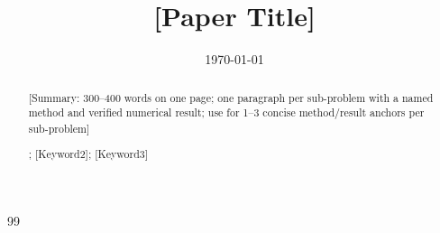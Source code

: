\documentclass{mcmthesis}
\title{[Paper Title]}
\date{\today}
\begin{document}
\begin{abstract}

[Summary: 300--400 words on one page; one paragraph per sub-problem with a named method and verified numerical result; use \textbf{} for 1--3 concise method/result anchors per sub-problem]

\begin{keywords}
[Keyword1]; [Keyword2]; [Keyword3]
\end{keywords}
\end{abstract}

\maketitle
\newpage









\begin{thebibliography}{99}
\end{thebibliography}

\begin{appendices}

\end{appendices}
\end{document}
